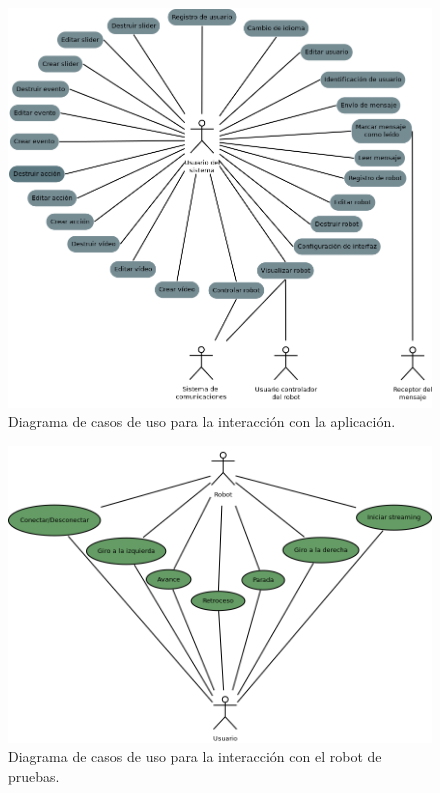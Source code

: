 \begin{figure}[H]
  \begin{center}
    \includegraphics[scale=.5]{diagramas/casos-uso.png}
  \end{center}
  \caption{Diagrama de casos de uso para la interacción con la aplicación.}
  \label{diagram:caso-uso}
\end{figure}


\begin{figure}[H]
  \begin{center}
    \includegraphics[scale=.5]{diagramas/casos-uso-robot.png}
  \end{center}
  \caption{Diagrama de casos de uso para la interacción con el robot de pruebas.}
  \label{diagram:caso-uso}
\end{figure}



